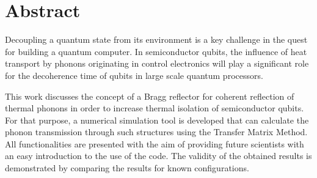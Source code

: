 \chapter*{Abstract}
Decoupling a quantum state from its environment is a key challenge in the quest
for building a quantum computer. 
In semiconductor qubits, the influence of heat transport by phonons 
 originating in control electronics will play a significant role for
the decoherence time of qubits in large scale quantum processors.

This work discusses the concept of a Bragg reflector for coherent
reflection of thermal phonons in order to increase thermal isolation of
semiconductor qubits. For that purpose, a numerical simulation tool is developed
that
can calculate the phonon transmission through such structures using
 the Transfer Matrix Method.
All functionalities are presented with the aim of providing future scientists
with an easy introduction to the use of the code.
The validity of the obtained results is demonstrated by comparing
the results for known configurations.